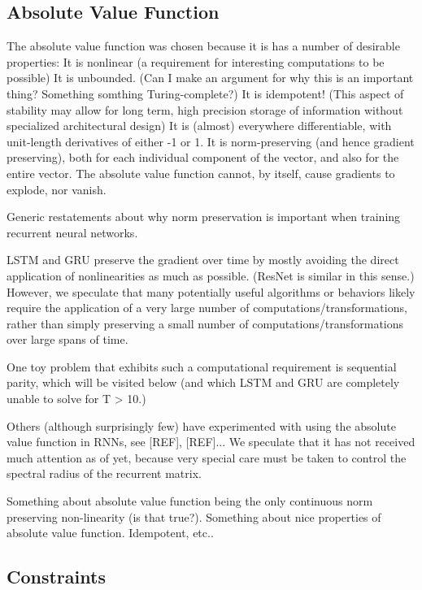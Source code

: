 \documentclass{article}
\begin{document}
\subsection{Absolute Value Function}

The absolute value function was chosen because it is has a number of desirable properties: 
It is nonlinear (a requirement for interesting computations to be possible)
It is unbounded. (Can I make an argument for why this is an important thing? Something somthing Turing-complete?)
It is idempotent! (This aspect of stability may allow for long term, high precision storage of information without specialized architectural design)
It is (almost) everywhere differentiable, with unit-length derivatives of either -1 or 1.
It is norm-preserving (and hence gradient preserving), both for each individual component of the vector, and also for the entire vector.
The absolute value function cannot, by itself, cause gradients to explode, nor vanish.

Generic restatements about why norm preservation is important when training recurrent neural networks.

LSTM and GRU preserve the gradient over time by mostly avoiding the direct application of nonlinearities as much as possible. (ResNet is similar in this sense.) However, we speculate that many potentially useful algorithms or behaviors likely require the application of a very large number of computations/transformations, rather than simply preserving a small number of computations/transformations over large spans of time.

One toy problem that exhibits such a computational requirement is sequential parity, which will be visited below (and which LSTM and GRU are completely unable to solve for T > 10.)

Others (although surprisingly few) have experimented with using the absolute value function in RNNs, see [REF], [REF]... 
We speculate that it has not received much attention as of yet, because very special care must be taken to control the spectral radius of the recurrent matrix.

Something about absolute value function being the only continuous norm preserving non-linearity (is that true?).
Something about nice properties of absolute value function. Idempotent, etc..

\subsection{Constraints}
\end{document}
